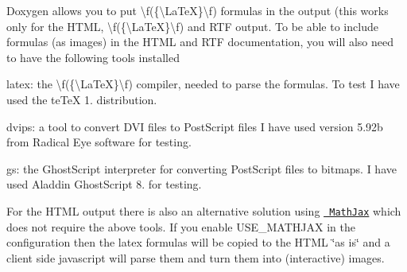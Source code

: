 Doxygen allows you to put \textbackslash{}f(\{\textbackslash{}\+La\+TeX\}\textbackslash{}f) formulas in the output (this works only for the H\+T\+ML, \textbackslash{}f(\{\textbackslash{}\+La\+TeX\}\textbackslash{}f) and R\+TF output. To be able to include formulas (as images) in the H\+T\+ML and R\+TF documentation, you will also need to have the following tools installed 
\begin{DoxyItemize}
\item {\ttfamily latex\+:} the \textbackslash{}f(\{\textbackslash{}\+La\+TeX\}\textbackslash{}f) compiler, needed to parse the formulas. To test I have used the te\+TeX 1. distribution. 
\item {\ttfamily dvips\+:} a tool to convert D\+VI files to Post\+Script files I have used version 5.\+92b from Radical Eye software for testing. 
\item {\ttfamily gs\+:} the Ghost\+Script interpreter for converting Post\+Script files to bitmaps. I have used Aladdin Ghost\+Script 8. for testing. 
\end{DoxyItemize}For the H\+T\+ML output there is also an alternative solution using \href{https://www.mathjax.org}{\texttt{ Math\+Jax}} which does not require the above tools. If you enable U\+S\+E\+\_\+\+M\+A\+T\+H\+J\+AX in the configuration then the latex formulas will be copied to the H\+T\+ML \char`\"{}as is\char`\"{} and a client side javascript will parse them and turn them into (interactive) images.

